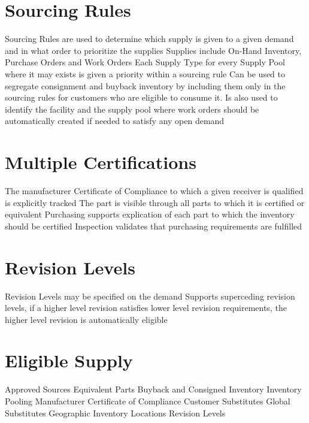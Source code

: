 \documentclass[letterpaper,10pt,english]{sphinxmanual}
\begin{document}
\section{Sourcing Rules}
\label{APS/ApsFeatures:id9}
Sourcing Rules are used to determine which supply is given to a given
demand and in what order to prioritize the supplies Supplies include
On-Hand Inventory, Purchase Orders and Work Orders Each Supply Type for
every Supply Pool where it may exists is given a priority within a
sourcing rule Can be used to segregate consignment and buyback inventory
by including them only in the sourcing rules for customers who are
eligible to consume it. Is also used to identify the facility and the
supply pool where work orders should be automatically created if needed
to satisfy any open demand


\section{Multiple Certifications}
\label{APS/ApsFeatures:id10}
The manufacturer Certificate of Compliance to which a given receiver is
qualified is explicitly tracked The part is visible through all parts to
which it is certified or equivalent Purchasing supports explication of
each part to which the inventory should be certified Inspection
validates that purchasing requirements are fulfilled


\section{Revision Levels}
\label{APS/ApsFeatures:id11}
Revision Levels may be specified on the demand Supports superceding
revision levels, if a higher level revision satisfies lower level
revision requirements, the higher level revision is automatically
eligible


\section{Eligible Supply}
\label{APS/ApsFeatures:eligible-supply}
Approved Sources Equivalent Parts Buyback and Consigned Inventory
Inventory Pooling Manufacturer Certificate of Compliance Customer
Substitutes Global Substitutes Geographic Inventory Locations Revision
Levels
\end{document}
